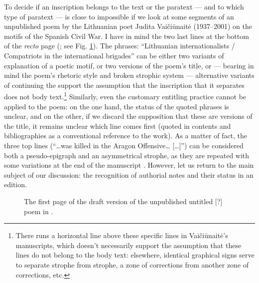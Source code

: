 \begin{paper}
To decide if an inscription belongs to the text or the paratext –– and
to which type of paratext –– is close to impossible if we look at some
segments of an unpublished poem by the Lithuanian poet Judita
Vaičiūnaitė (1937--2001) on the motifs of the Spanish Civil War. I have
in mind the two last lines at the bottom of the \emph{recto} page
(\citealt[1r]{vaiciunaite_untitled_1961}; see Fig. \ref{fig:subacius8}). The phrases: ``Lithuanian
internationalists / Compatriots in the international brigades'' can
be either two variants of explanation of a poetic motif, or two versions
of the poem's title, or –– bearing in mind the poem's rhetoric style
and broken strophic system –– alternative variants of continuing the
  support the assumption that the inscription that it separates does not
body text.\footnote{There runs a horizontal line above these specific lines in Vaičiūnaitė's manuscripts, which doesn't necessarily support the assumption that these lines do not belong to the body text: elsewhere, identical graphical signs serve
  to separate strophe from strophe, a zone of corrections from another
  zone of corrections, etc.} Similarly, even the customary
entitling practice cannot be applied to the poem: on the one hand, the
status of the quoted phrases is unclear, and on the other, if we discard
the supposition that these are versions of the title, it remains unclear
which line comes first (quoted in contents and bibliographies as a
conventional reference to the work). As a matter of fact, the three top
lines (``\ldots was killed in the Aragon Offensive\ldots{} [\ldots]'')
can be considered both a pseudo-epigraph and an asymmetrical strophe, as
they are repeated with some variations at the end of the manuscript \citep[1v]{vaiciunaite_untitled_1961}. However, let us return to the main subject of our
discussion: the recognition of authorial notes and their status in an
edition.

\begin{figure}[H]
    \centering
    \caption{The first page of the draft version of the unpublished untitled {[}?{]} poem in \citealt[1r]{vaiciunaite_untitled_1961}.}
    \label{fig:subacius8}
\end{figure}


\end{paper}

